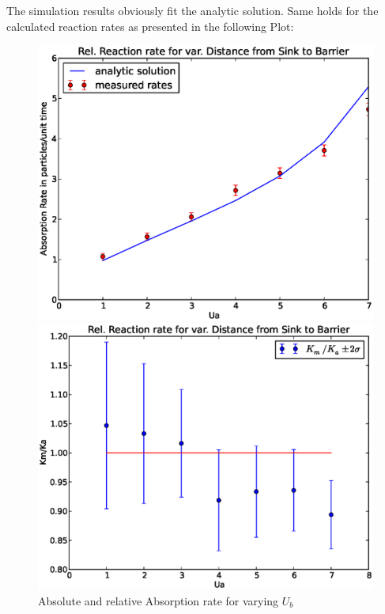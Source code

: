 The simulation results obviously fit the analytic solution. Same holds for the calculated reaction rates as presented in the following Plot:
\begin{figure}[H]
\centering
\begin{minipage}{.5 \textwidth}
    \centering
    \includegraphics[width=.95 \textwidth, keepaspectratio]{plots/cp/ub/Kabs.eps}
\end{minipage}\begin{minipage}{.5 \textwidth}
    \includegraphics[width=.95 \textwidth, keepaspectratio]{plots/cp/ub/Krel.eps}
\end{minipage}
\caption{Absolute and relative Absorption rate for varying $U_b$}
\label{fig:KUbCp}
\end{figure}



